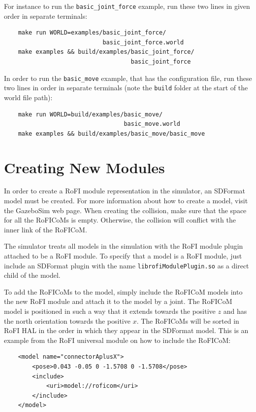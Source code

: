 \documentclass[
  printed, %
  color,   %
  notable, %
  oneside, %
  nolof,   %
  nolot,   %
  nocover,
]{fithesis3}
\newcommand{\code}[1]{\texttt{#1}}
\begin{document}
For instance to run the \code{basic\_joint\_force} example, run these two lines in given order in separate terminals:
\begin{center}
\begin{verbatim}
    make run WORLD=examples/basic_joint_force/
                            basic_joint_force.world
    make examples && build/examples/basic_joint_force/
                                    basic_joint_force
\end{verbatim}
\end{center}

In order to run the \code{basic\_move} example, that has the configuration file, run these two lines in order in separate terminals (note the \code{build} folder at the start of the world file path):
\begin{center}
\begin{verbatim}
    make run WORLD=build/examples/basic_move/
                                  basic_move.world
    make examples && build/examples/basic_move/basic_move
\end{verbatim}
\end{center}


\section{Creating New Modules}
\label{ex-modules}

In order to create a RoFI module representation in the simulator, an SDFormat model must be created.
For more information about how to create a model, visit the GazeboSim web page\cite{gazebo}.
When creating the collision, make sure that the space for all the RoFICoMs is empty.
Otherwise, the collision will conflict with the inner link of the RoFICoM.

The simulator treats all models in the simulation with the RoFI module plugin attached to be a RoFI module.
To specify that a model is a RoFI module, just include an SDFormat plugin with the name \code{librofiModulePlugin.so} as a direct child of the model.

To add the RoFICoMs to the model, simply include the RoFICoM models into the new RoFI module and attach it to the model by a joint.
The RoFICoM model is positioned in such a way that it extends towards the positive $z$ and has the north orientation towards the positive $x$.
The RoFICoMs will be sorted in RoFI HAL in the order in which they appear in the SDFormat model.
This is an example from the RoFI universal module on how to include the RoFICoM:
\begin{center}
\begin{verbatim}
    <model name="connectorAplusX">
        <pose>0.043 -0.05 0 -1.5708 0 -1.5708</pose>
        <include>
            <uri>model://roficom</uri>
        </include>
    </model>
\end{verbatim}
\end{center}
\end{document}
